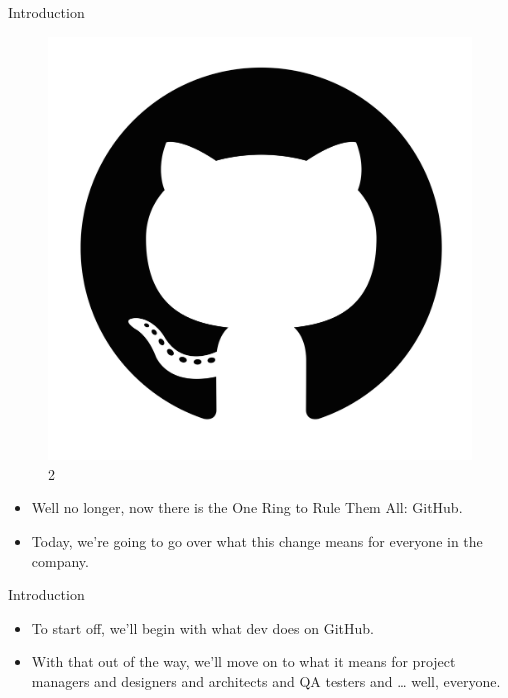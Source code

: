 \documentclass[ignorenonframetext,,aspectratio=169,14pt]{beamer}
\begin{document}
\begin{frame}{Introduction}

\begin{figure}[htbp]
\centering
\includegraphics{img/github.png}
\caption{2}
\end{figure}

\begin{itemize}
\itemsep1pt\parskip0pt
\item
  Well no longer, now there is the One Ring to Rule Them All: GitHub.
\item
  Today, we're going to go over what this change means for everyone in
  the company.
\end{itemize}

\end{frame}

\begin{frame}{Introduction}

\begin{itemize}
\itemsep1pt\parskip0pt
\item
  To start off, we'll begin with what dev does on GitHub.
\item
  With that out of the way, we'll move on to what it means for project
  managers and designers and architects and QA testers and \ldots{}
  well, everyone.
\end{itemize}

\end{frame}
\end{document}
